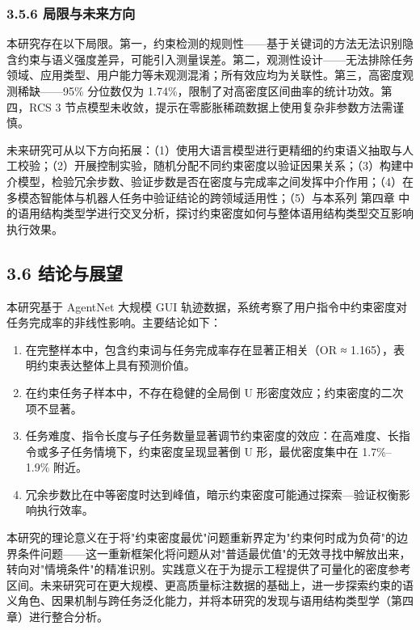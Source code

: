 \documentclass[12pt,a4paper,openany,oneside]{ctexrep}
\begin{document}
\subsubsection{3.5.6 局限与未来方向}


本研究存在以下局限。第一，约束检测的规则性——基于关键词的方法无法识别隐含约束与语义强度差异，可能引入测量误差。第二，观测性设计——无法排除任务领域、应用类型、用户能力等未观测混淆；所有效应均为关联性。第三，高密度观测稀缺——95\% 分位数仅为 1.74\%，限制了对高密度区间曲率的统计功效。第四，RCS 3 节点模型未收敛，提示在零膨胀稀疏数据上使用复杂非参数方法需谨慎。

未来研究可从以下方向拓展：（1）使用大语言模型进行更精细的约束语义抽取与人工校验；（2）开展控制实验，随机分配不同约束密度以验证因果关系；（3）构建中介模型，检验冗余步数、验证步数是否在密度与完成率之间发挥中介作用；（4）在多模态智能体与机器人任务中验证结论的跨领域适用性；（5）与本系列 第四章 中的语用结构类型学进行交叉分析，探讨约束密度如何与整体语用结构类型交互影响执行效果。

\subsection{3.6 结论与展望}


本研究基于 AgentNet 大规模 GUI 轨迹数据，系统考察了用户指令中约束密度对任务完成率的非线性影响。主要结论如下：

\begin{enumerate}
\item[1.] 在完整样本中，包含约束词与任务完成率存在显著正相关（OR ≈ 1.165），表明约束表达整体上具有预测价值。
\item[2.] 在约束任务子样本中，不存在稳健的全局倒 U 形密度效应；约束密度的二次项不显著。
\item[3.] 任务难度、指令长度与子任务数量显著调节约束密度的效应：在高难度、长指令或多子任务情境下，约束密度呈现显著倒 U 形，最优密度集中在 1.7\%–1.9\% 附近。
\item[4.] 冗余步数比在中等密度时达到峰值，暗示约束密度可能通过探索—验证权衡影响执行效率。
\end{enumerate}


本研究的理论意义在于将"约束密度最优"问题重新界定为"约束何时成为负荷"的边界条件问题——这一重新框架化将问题从对"普适最优值"的无效寻找中解放出来，转向对"情境条件"的精准识别。实践意义在于为提示工程提供了可量化的密度参考区间。未来研究可在更大规模、更高质量标注数据的基础上，进一步探索约束的语义角色、因果机制与跨任务泛化能力，并将本研究的发现与语用结构类型学（第四章）进行整合分析。
\end{document}

